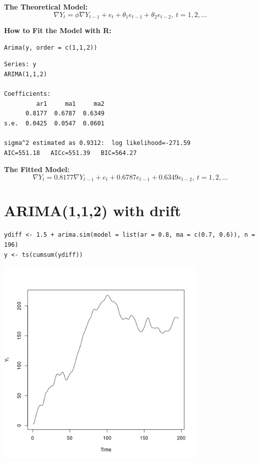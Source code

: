 \documentclass[12pt]{article}
\begin{document}
\noindent
\textbf{The Theoretical Model:} 
\[
\nabla Y_{t} = \phi \nabla Y_{t - 1} +  e_{t} + \theta_{1} e_{t - 1} + \theta_{2} e_{t - 2},\ t = 1,2,\ldots
\]

\noindent
\textbf{How to Fit the Model with R:}


\begin{verbatim}
Arima(y, order = c(1,1,2))
\end{verbatim}




\begin{verbatim}
Series: y 
ARIMA(1,1,2)                    

Coefficients:
         ar1     ma1     ma2
      0.8177  0.6787  0.6349
s.e.  0.0425  0.0547  0.0601

sigma^2 estimated as 0.9312:  log likelihood=-271.59
AIC=551.18   AICc=551.39   BIC=564.27
\end{verbatim}

\noindent
\textbf{The Fitted Model:} 
\[
\nabla Y_{t} =  0.8177 \nabla Y_{t - 1} + e_{t} +  0.6787 e_{t - 1} +  0.6349 e_{t - 2},\ t = 1,2,\ldots
\]
\section*{ARIMA(1,1,2) with drift}
\label{sec-8}


\begin{verbatim}
ydiff <- 1.5 + arima.sim(model = list(ar = 0.8, ma = c(0.7, 0.6)), n = 196)
y <- ts(cumsum(ydiff))
\end{verbatim}





\includegraphics[width=4.0in]{img/arima112nzm.png}
\end{document}
